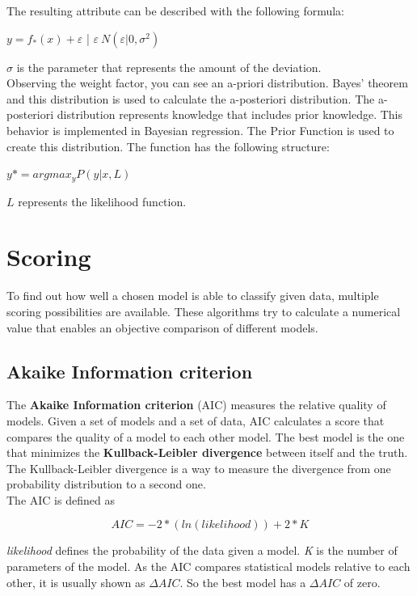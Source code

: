 \documentclass[sigconf]{acmart}
\begin{document}
The resulting attribute can be described with the following formula:
\begin{center}
$y = f_*(x) + \varepsilon$ | $\varepsilon ~ N(\varepsilon|0,\sigma^2)$
\end{center}

$\sigma$ is the parameter that represents the amount of the deviation.\\
Observing the weight factor, you can see an a-priori distribution. Bayes' theorem and this distribution is used to calculate the a-posteriori distribution. The a-posteriori distribution represents knowledge that includes prior knowledge. This behavior is implemented in Bayesian regression. The Prior Function is used to create this distribution. The function has the following structure:
\begin{center}
$y* = arg max_{y}P(y|x,L)$
\end{center}

$L$ represents the likelihood function.

\section*{Scoring}
To find out how well a chosen model is able to classify given data, multiple scoring possibilities are available. These algorithms try to calculate a numerical value that enables an objective comparison of different models.

\subsection*{Akaike Information criterion}
The \textbf{Akaike Information criterion} (AIC) measures the relative quality of models. Given a set of models and a set of data, AIC calculates a score that compares the quality of a model to each other model. The best model is the one that minimizes the \textbf{Kullback-Leibler divergence} between itself and the truth. The Kullback-Leibler divergence is a way to measure the divergence from one probability distribution to a second one.\\
\newpage
The AIC is defined as
\begin{center}
$$AIC = -2 * (ln(likelihood)) + 2*K$$
\end{center}
\textit{likelihood} defines the probability of the data given a model. \textit{K} is the number of parameters of the model. As the AIC compares statistical models relative to each other, it is usually shown as $\Delta AIC$. So the best model has a $\Delta AIC$ of zero.
\end{document}
